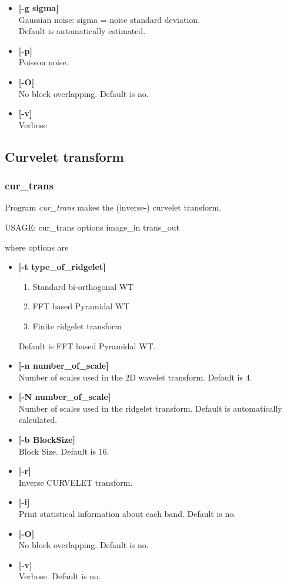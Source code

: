 \documentclass[11pt,a4paper]{article}
\begin{document}
\begin{itemize}
\item {\bf [-g sigma]} \\
Gaussian noise: sigma = noise standard deviation.  \\
 Default is automatically estimated.

\item {\bf [-p]} \\
Poisson noise.

\item {\bf [-O]}  \\
 No block overlapping. Default is no.

\item {\bf [-v]} \\
Verbose
\end{itemize}

\subsection{Curvelet transform}
\subsubsection{cur\_trans}

Program {\em cur\_trans} makes the (inverse-) curvelet transform.
\begin{center}
 USAGE:  cur\_trans options image\_in trans\_out
\end{center}
where options are 
\begin{itemize}
\item {\bf [-t type\_of\_ridgelet]} \\
\begin{enumerate}
\item Standard bi-orthogonal WT
\item FFT based Pyramidal WT  
\item Finite ridgelet transform
\end{enumerate}
Default is FFT based Pyramidal WT.
\item {\bf [-n number\_of\_scale]} \\
 Number of scales used in the 2D wavelet transform.
 Default is 4. 
\item {\bf [-N number\_of\_scale]} \\
 Number of scales used in the ridgelet transform.
 Default is automatically calculated.
\item {\bf [-b BlockSize]}  \\
Block Size. Default is 16.
\item {\bf [-r]}  \\
Inverse CURVELET transform.
\item {\bf [-i]}  \\
Print statistical information about each band. Default is no. 
\item {\bf [-O]}  \\
 No block overlapping. Default is no. 
\item {\bf [-v]} \\
Verbose. Default is no.
\end{itemize}
\end{document}
